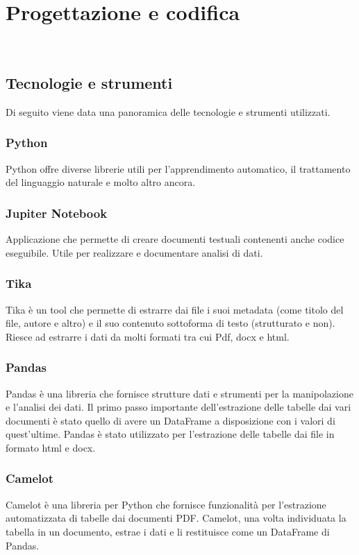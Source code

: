 \chapter{Progettazione e codifica}
\label{cap:progettazione-codifica}

\\

\section{Tecnologie e strumenti}
\label{sec:tecnologie-strumenti}

Di seguito viene data una panoramica delle tecnologie e strumenti utilizzati.
\subsection{Python}
Python offre diverse librerie utili per l'apprendimento automatico, il trattamento del linguaggio naturale e molto altro ancora.
\subsection{Jupiter Notebook}
Applicazione che permette di creare documenti testuali contenenti anche codice eseguibile. Utile per realizzare e documentare analisi di dati.
\subsection{Tika}
\label{subsec:tika}
Tika è un tool che permette di estrarre dai file i suoi metadata (come titolo del file, autore e altro) e il suo contenuto sottoforma di testo (strutturato e non).
Riesce ad estrarre i dati da molti formati tra cui Pdf, docx e html.
\subsection{Pandas}
Pandas è una libreria che fornisce strutture dati e strumenti per la manipolazione e l'analisi dei dati.
Il primo passo importante dell'estrazione delle tabelle dai vari documenti è stato quello di avere un DataFrame a disposizione con i valori di quest'ultime. 
Pandas è stato utilizzato per l'estrazione delle tabelle dai file in formato html e docx.
\subsection{Camelot}
Camelot è una libreria per Python che fornisce funzionalità per l'estrazione automatizzata di tabelle dai documenti PDF.
Camelot, una volta individuata la tabella in un documento, estrae i dati e li restituisce come un DataFrame di Pandas.
